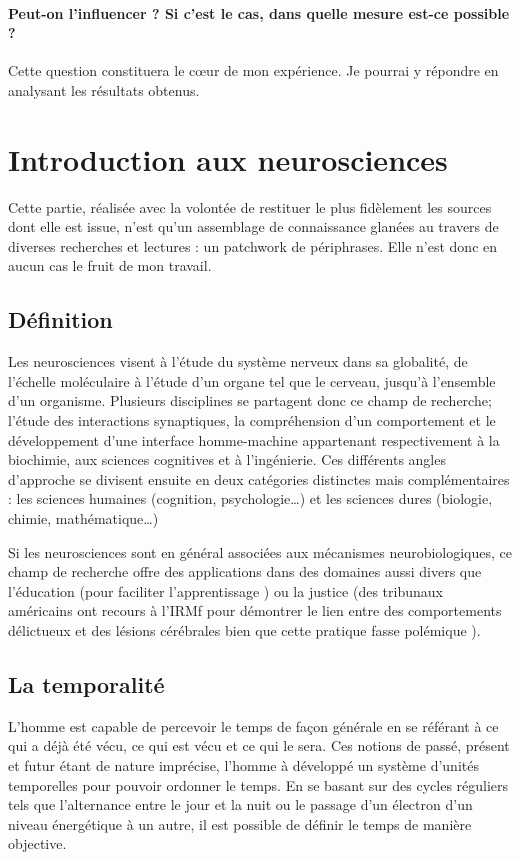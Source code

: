 \documentclass[12pt,fleqn,oneside,openany,]{book} %
\begin{document}
\paragraph{Peut-on l'influencer ? Si c'est le cas, dans quelle mesure est-ce possible ? } Cette question constituera le cœur de mon expérience. Je pourrai y répondre en analysant les résultats obtenus. 


\section{Introduction aux neurosciences} \label{sec:introNeuro}
\begin{remark}
	Cette partie, réalisée avec la volontée de restituer le plus fidèlement les sources dont elle est issue, n'est qu'un assemblage de connaissance glanées au travers de diverses recherches et lectures : un patchwork de périphrases. Elle n'est donc en aucun cas le fruit de mon travail.
\end{remark}

\subsection[Définition]{Définition \cite{wikineuro}} \label{ssec:definition} %
Les neurosciences visent à l'étude du système nerveux dans sa globalité, de l'échelle moléculaire à l'étude d'un organe tel que le cerveau, jusqu'à l'ensemble d'un organisme. Plusieurs disciplines se partagent donc ce champ de recherche; l'étude des interactions synaptiques, la compréhension d'un comportement et le développement d'une interface homme-machine appartenant respectivement à la biochimie, aux sciences cognitives et à l'ingénierie. Ces différents angles d'approche se divisent ensuite en deux catégories distinctes mais complémentaires : les sciences humaines (cognition, psychologie…) et les sciences dures (biologie, chimie, mathématique…) 


Si les neurosciences sont en général associées aux mécanismes neurobiologiques, ce champ de recherche offre des applications dans des domaines aussi divers que l'éducation (pour faciliter l'apprentissage \cite{pedagogie}) ou la justice (des tribunaux américains ont recours à l'IRMf pour démontrer le lien entre des comportements délictueux et des lésions cérébrales bien que cette pratique fasse polémique \cite{justice}).

\subsection[La temporalité]{La temporalité \cite{reptemps}} \label{ssec:temporalite} %
L'homme est capable de percevoir le temps de façon générale en se référant à ce qui a déjà été vécu, ce qui est vécu et ce qui le sera. Ces notions de passé, présent et futur étant de nature imprécise, l'homme à développé un système d'unités temporelles pour pouvoir ordonner le temps. En se basant sur des cycles réguliers tels que l'alternance entre le jour et la nuit ou le passage d'un électron d'un niveau énergétique à un autre, il est possible de définir le temps de manière objective. 
\end{document}
